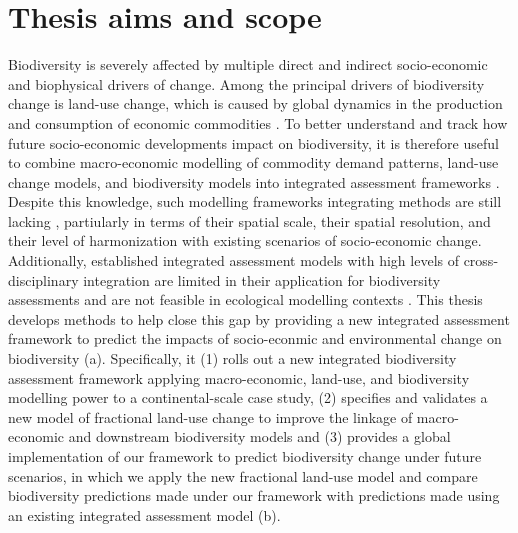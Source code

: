 \documentclass[titlesmallcaps,copyrightpage]{uomthesis}\usepackage[]{graphicx}\usepackage[]{color}
\begin{document}
\section{Thesis aims and scope}
Biodiversity is severely affected by multiple direct and indirect socio-economic and biophysical drivers of change. Among the principal drivers of biodiversity change is land-use change, which is caused by global dynamics in the production and consumption of economic commodities \citep{ipbes_summary_2019}. To better understand and track how future socio-economic developments impact on biodiversity, it is therefore useful to combine macro-economic modelling of commodity demand patterns, land-use change models, and biodiversity models into integrated assessment frameworks \citep{ipbes_summary_2016, kapitza_assessing_2021}. Despite this knowledge, such modelling frameworks integrating methods are still lacking \citep{titeux_global_2017}, partiularly in terms of their spatial scale, their spatial resolution, and their level of harmonization with existing scenarios of socio-economic change. Additionally, established integrated assessment models with high levels of cross-disciplinary integration are limited in their application for biodiversity assessments and are not feasible in ecological modelling contexts \citep{hauck_reviewing_2015, veerkamp_future_2020}.
This thesis develops methods to help close this gap by providing a new integrated assessment framework to predict the impacts of socio-econmic and environmental change on biodiversity (a). Specifically, it (1) rolls out a new integrated biodiversity assessment framework applying macro-economic, land-use, and biodiversity modelling power to a continental-scale case study, (2) specifies and validates a new model of fractional land-use change to improve the linkage of macro-economic and downstream biodiversity models and (3) provides a global implementation of our framework to predict biodiversity change under future scenarios, in which we apply the new fractional land-use model and compare biodiversity predictions made under our framework with predictions made using an existing integrated assessment model (b).
\end{document}
